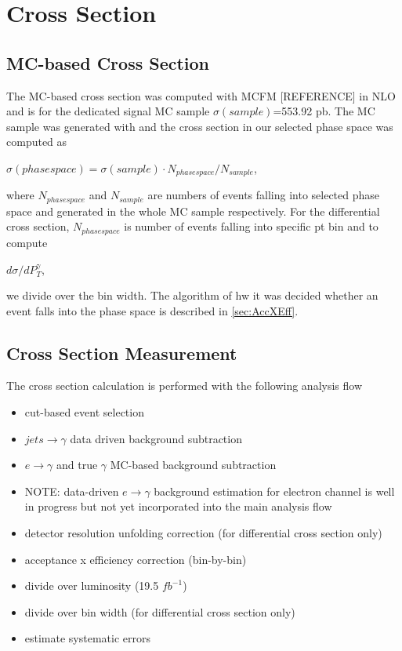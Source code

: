 \section{Cross Section}
\label{sec:CrossSection}
\subsection {MC-based Cross Section}
The MC-based cross section was computed with MCFM [REFERENCE] in NLO and is for the dedicated signal MC sample $\sigma(sample)$=553.92 pb. The MC sample was generated with \MADGRAPH [REFERENCE] and the cross section in our selected phase space was computed as 
\begin{center}
$\sigma(phase space) = \sigma(sample) \cdot N_{phase space} / N_{sample}$, 
\end{center} 
where  $N_{phase space}$ and $N_{sample}$ are numbers of events falling into selected phase space and generated in the whole MC sample respectively. For the differential cross section, $N_{phase space}$ is number of events falling into specific pt bin and to compute 
\begin{center}
$d\sigma / dP_T^{\gamma}$, 
\end{center} 
we divide over the bin width.
The algorithm of hw it was decided whether an event falls into the phase space is described in \ref{sec:AccXEff}.
\subsection {Cross Section Measurement}
The cross section calculation is performed with the following analysis flow
\begin{itemize}
  \item cut-based  event selection
  \item $jets \rightarrow \gamma$ data driven background subtraction
  \item $e \rightarrow \gamma $ and true $\gamma$ MC-based background subtraction
  \item NOTE: data-driven $e \rightarrow \gamma$ background estimation for electron channel is well in progress but not yet incorporated into the main analysis flow
  \item detector resolution unfolding correction (for differential cross section only)
  \item acceptance x efficiency correction (bin-by-bin)
  \item divide over luminosity (19.5 $fb^{-1}$)
  \item divide over bin width (for differential cross section only)
  \item estimate systematic errors
\end{itemize}

